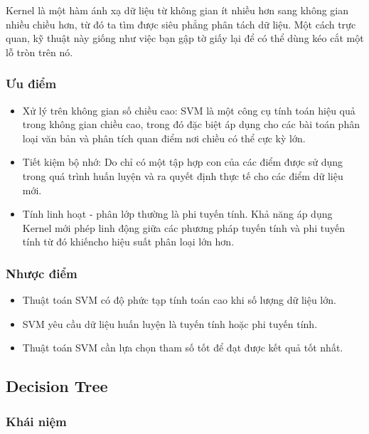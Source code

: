 \documentclass[
]{article}
\begin{document}
Kernel là một hàm ánh xạ dữ liệu từ không gian ít nhiều hơn sang không
gian nhiều chiều hơn, từ đó ta tìm được siêu phẳng phân tách dữ liệu.
Một cách trực quan, kỹ thuật này giống như việc bạn gập tờ giấy lại để
có thể dùng kéo cắt một lỗ tròn trên nó.

\subsubsection{Ưu điểm}\label{ux1b0u-ux111iux1ec3m-1}

\begin{itemize}
\item
  Xử lý trên không gian số chiều cao: SVM là một công cụ tính toán hiệu
  quả trong không gian chiều cao, trong đó đặc biệt áp dụng cho các bài
  toán phân loại văn bản và phân tích quan điểm nơi chiều có thể cực kỳ
  lớn.
\item
  Tiết kiệm bộ nhớ: Do chỉ có một tập hợp con của các điểm được sử dụng
  trong quá trình huấn luyện và ra quyết định thực tế cho các điểm dữ
  liệu mới.
\item
  Tính linh hoạt - phân lớp thường là phi tuyến tính. Khả năng áp dụng
  Kernel mới phép linh động giữa các phương pháp tuyến tính và phi tuyến
  tính từ đó khiếncho hiệu suất phân loại lớn hơn.
\end{itemize}

\subsubsection{Nhược điểm}\label{nhux1b0ux1ee3c-ux111iux1ec3m-1}

\begin{itemize}
\item
  Thuật toán SVM có độ phức tạp tính toán cao khi số lượng dữ liệu lớn.
\item
  SVM yêu cầu dữ liệu huấn luyện là tuyến tính hoặc phi tuyến tính.
\item
  Thuật toán SVM cần lựa chọn tham số tốt để đạt được kết quả tốt nhất.
\end{itemize}

\subsection{Decision Tree}\label{decision-tree}

\subsubsection{Khái niệm}\label{khuxe1i-niux1ec7m-3}
\end{document}
